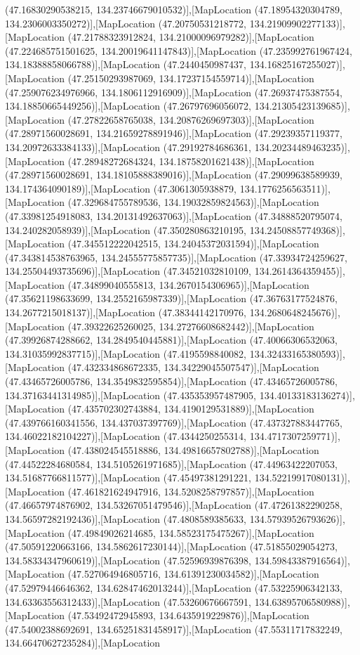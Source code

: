 (47.16830290538215, 134.23746679010532)],[MapLocation (47.18954320304789, 134.2306003350272)],[MapLocation (47.20750531218772, 134.21909902277133)],[MapLocation (47.21788323912824, 134.21000096979282)],[MapLocation (47.224685751501625, 134.20019641147843)],[MapLocation (47.235992761967424, 134.18388858066788)],[MapLocation (47.2440450987437, 134.16825167255027)],[MapLocation (47.25150293987069, 134.17237154559714)],[MapLocation (47.259076234976966, 134.1806112916909)],[MapLocation (47.26937475387554, 134.18850665449256)],[MapLocation (47.26797696056072, 134.21305423139685)],[MapLocation (47.27822658765038, 134.20876269697303)],[MapLocation (47.28971560028691, 134.21659278891946)],[MapLocation (47.29239357119377, 134.20972633384133)],[MapLocation (47.29192784686361, 134.20234489463235)],[MapLocation (47.28948272684324, 134.18758201621438)],[MapLocation (47.28971560028691, 134.18105888389016)],[MapLocation (47.29099638589939, 134.174364090189)],[MapLocation (47.3061305938879, 134.1776256563511)],[MapLocation (47.329684755789536, 134.19032859824563)],[MapLocation (47.33981254918083, 134.20131492637063)],[MapLocation (47.34888520795074, 134.240282058939)],[MapLocation (47.350280863210195, 134.24508857749368)],[MapLocation (47.345512222042515, 134.24045372031594)],[MapLocation (47.343814538763965, 134.24555775857735)],[MapLocation (47.33934724259627, 134.25504493735696)],[MapLocation (47.34521032810109, 134.2614364359455)],[MapLocation (47.34899040555813, 134.2670154306965)],[MapLocation (47.35621198633699, 134.2552165987339)],[MapLocation (47.36763177524876, 134.2677215018137)],[MapLocation (47.38344142170976, 134.2680648245676)],[MapLocation (47.39322625260025, 134.27276608682442)],[MapLocation (47.39926874288662, 134.2849540445881)],[MapLocation (47.40066306532063, 134.31035992837715)],[MapLocation (47.4195598840082, 134.32433165380593)],[MapLocation (47.432334868672335, 134.34229045507547)],[MapLocation (47.43465726005786, 134.3549832595854)],[MapLocation (47.43465726005786, 134.37163441314985)],[MapLocation (47.435353957487905, 134.40133183136274)],[MapLocation (47.435702302743884, 134.4190129531889)],[MapLocation (47.439766160341556, 134.437037397769)],[MapLocation (47.437327883447765, 134.46022182104227)],[MapLocation (47.4344250255314, 134.4717307259771)],[MapLocation (47.438024545518886, 134.49816657802788)],[MapLocation (47.44522284680584, 134.5105261971685)],[MapLocation (47.44963422207053, 134.51687766811577)],[MapLocation (47.45497381291221, 134.52219917080131)],[MapLocation (47.461821624947916, 134.5208258797857)],[MapLocation (47.46657974876902, 134.53267051479546)],[MapLocation (47.47261382290258, 134.56597282192436)],[MapLocation (47.4808589385633, 134.57939526793626)],[MapLocation (47.49849026214685, 134.58523175475267)],[MapLocation (47.50591220663166, 134.5862617230144)],[MapLocation (47.51855029054273, 134.58334347960619)],[MapLocation (47.52596939876398, 134.59843387916564)],[MapLocation (47.527064946805716, 134.61391230034582)],[MapLocation (47.52979446646362, 134.62847462013244)],[MapLocation (47.53225906342133, 134.63363556312433)],[MapLocation (47.53260676667591, 134.63895706580988)],[MapLocation (47.53492472945893, 134.6435919229876)],[MapLocation (47.54002388692691, 134.65251831458917)],[MapLocation (47.55311717832249, 134.66470627235284)],[MapLocation 